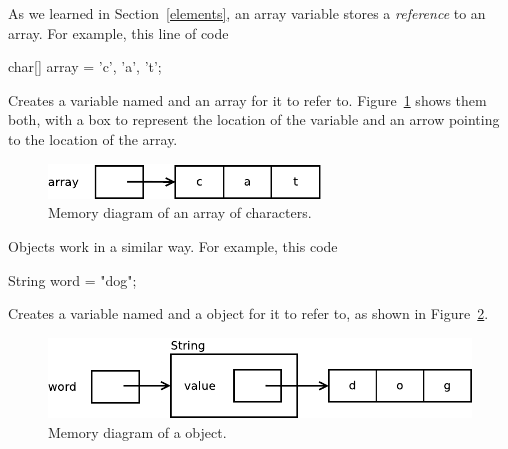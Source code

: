 
As we learned in Section~\ref{elements}, an array variable stores a {\em reference} to an array.
For example, this line of code

\begin{code}
    char[] array = {'c', 'a', 't'};
\end{code}

Creates a variable named  and an array for it to refer to. 
Figure~\ref{fig.mem2} shows them both, with a box to represent the location of the variable and an arrow pointing to the location of the array.

\begin{figure}[!ht]
\begin{center}
\includegraphics[width=205pt]{figs/mem2.pdf}
\caption{Memory diagram of an array of characters.}
\label{fig.mem2}
\end{center}
\end{figure}

Objects work in a similar way.
For example, this code

\begin{code}
String word = "dog";
\end{code}

Creates a  variable named  and a  object for it to refer to, as shown in Figure~\ref{fig.mem3}.

\begin{figure}[!ht]
\begin{center}
\includegraphics[width=325pt]{figs/mem3.pdf}
\caption{Memory diagram of a  object.}
\label{fig.mem3}
\end{center}
\end{figure}



